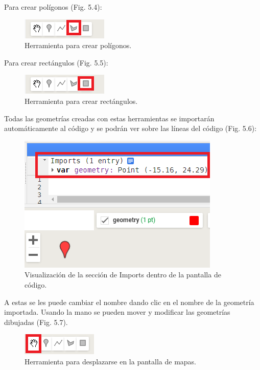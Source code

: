 \documentclass[
  12pt,
  letterpaper,
  twoside]{book}
\begin{document}
Para crear polígonos (Fig. 5.4):

\begin{figure}[btp]

{\centering \includegraphics[width=0.2\linewidth]{Img/poligono} 

}

\caption{Herramienta para crear polígonos.}\label{fig:unnamed-chunk-56}
\end{figure}

Para crear rectángulos (Fig. 5.5):

\begin{figure}[btp]

{\centering \includegraphics[width=0.2\linewidth]{Img/rec} 

}

\caption{Herramienta para crear rectángulos.}\label{fig:unnamed-chunk-57}
\end{figure}

Todas las geometrías creadas con estas herramientas se importarán automáticamente al código y se podrán ver sobre las líneas del código (Fig. 5.6):

\begin{figure}[btp]

{\centering \includegraphics[width=0.5\linewidth]{Img/import} 

}

\caption{Visualización de la sección de Imports dentro de la pantalla de código.}\label{fig:unnamed-chunk-58}
\end{figure}

A estas se les puede cambiar el nombre dando clic en el nombre de la geometría importada.
Usando la mano se pueden mover y modificar las geometrías dibujadas (Fig. 5.7).

\begin{figure}[btp]

{\centering \includegraphics[width=0.2\linewidth]{Img/mano} 

}

\caption{Herramienta para desplazarse en la pantalla de mapas.}\label{fig:unnamed-chunk-59}
\end{figure}
\end{document}
